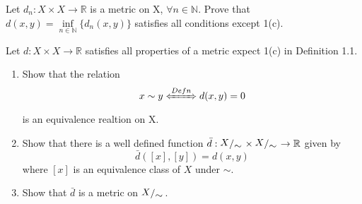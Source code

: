 \vspace{0.1in}

\begin{exr}
Let $d_{n} : X\times X \rightarrow \mathbb{R}$ is a metric on X, $\forall n \in \mathbb{N}$.
Prove that $d(x, y) = \operatorname*{inf}\limits_{n \in \mathbb{N}}\{d_{n}(x,y)\}$ satisfies
all conditions except 1(c).
\end{exr}

\begin{exr}
Let $d : X\times X \rightarrow \mathbb{R}$ satisfies all properties of a metric
expect 1(c) in Definition 1.1.

\begin{enumerate}
\item Show that the relation  $$x \sim y \xLeftrightarrow[]{Defn} d(x,y) = 0$$
  is an equivalence realtion on X.

\item Show that there is a well defined function
  $\bar{d} : \bigslant{X}{\sim} \times \bigslant{X}{\sim} \rightarrow \mathbb{R} $
  given by $$ \bar{d}([x], [y]) = d(x, y) $$
  where $[x]$ is an equivalence class of $X$ under $\sim$.

\item Show that $\bar{d}$ is a metric on $\bigslant{X}{\sim}$.
\end{enumerate}
\end{exr}
